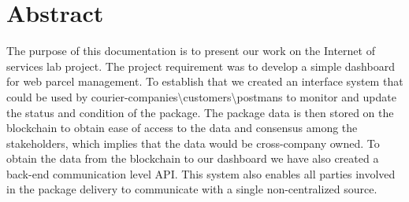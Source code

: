 \chapter*{Abstract}
\label{cha:abstract}
\vspace{10 mm}

The purpose of this documentation is to present our work on the Internet of services lab project. The project requirement was to develop a simple dashboard for web parcel management. To establish that we created an interface system that could be used by courier-companies\textbackslash customers\textbackslash postmans to monitor and update the status and condition of the package. The package data is then stored on the blockchain to obtain ease of access to the data and consensus among the stakeholders, which implies that the data would be cross-company owned. To obtain the data from the blockchain to our dashboard we have also created a back-end communication level API.
This system also enables all parties involved in the package delivery to communicate with a single non-centralized source.
